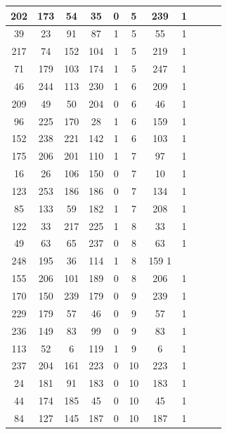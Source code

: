\documentclass[12pt]{jreport}
\begin{document}
\begin{table}[htb]
\begin{center}
\begin{tabular} {|c|c|c|c|c|c|c|c|c|c|c|}
                        202 & 173 & 54 & 35 & 0 & 5 & 239 & 1 \\ \hline
                        39 & 23 & 91 & 87 & 1 & 5 & 55 & 1 \\ \hline
                        217 & 74 & 152 & 104 & 1 & 5 & 219 & 1 \\ \hline
                        71 & 179 & 103 & 174 & 1 & 5 & 247 & 1 \\ \hline

                        46 & 244 & 113 & 230 & 1 & 6 & 209 & 1 \\ \hline
                        209 & 49 & 50 & 204 & 0 & 6 & 46 & 1 \\ \hline
                        96 & 225 & 170 & 28 & 1 & 6 & 159 & 1 \\ \hline
                        152 & 238 & 221 & 142 & 1 & 6 & 103 & 1 \\ \hline

                        175 & 206 & 201 & 110 & 1 & 7 & 97 & 1 \\ \hline
                        16 & 26 & 106 & 150 & 0 & 7 & 10 & 1 \\ \hline
                        123 & 253 & 186 & 186 & 0 & 7 & 134 & 1 \\ \hline
                        85 & 133 & 59 & 182 & 1 & 7 & 208 & 1 \\ \hline

                        122 & 33 & 217 & 225 & 1 & 8 & 33 & 1 \\ \hline
                        49 & 63 & 65 & 237 & 0 & 8 & 63 & 1 \\ \hline
                        248 & 195 & 36 & 114 & 1 & 8 & 159 1 \\ \hline
                        155 & 206 & 101 & 189 & 0 & 8 & 206 & 1 \\ \hline

                        170 & 150 & 239 & 179 & 0 & 9 & 239 & 1 \\ \hline
                        229 & 179 & 57 & 46 & 0 & 9 & 57 & 1 \\ \hline
                        236 & 149 & 83 & 99 & 0 & 9 & 83 & 1 \\ \hline
                        113 & 52 & 6 & 119 & 1 & 9 & 6 & 1 \\ \hline

                        237 & 204 & 161 & 223 & 0 & 10 & 223 & 1 \\ \hline
                        24 & 181 & 91 & 183 & 0 & 10 & 183 & 1 \\ \hline
                        44 & 174 & 185 & 45 & 0 & 10 & 45 & 1 \\ \hline
                        84 & 127 & 145 & 187 & 0 & 10 & 187 & 1 \\ \hline


\end{tabular}
\end{center}
\end{table}
\end{document}
